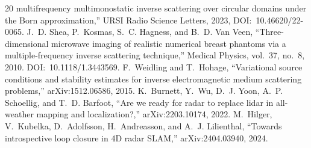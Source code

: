 \documentclass[12pt]{article}
\begin{document}
\begin{thebibliography}{20}
multifrequency multimonostatic inverse scattering over circular domains under
the Born approximation,'' URSI Radio Science Letters, 2023,
DOI:~10.46620/22-0065.
 J.~D. Shea, P.~Kosmas, S.~C. Hagness, and B.~D. Van Veen,
``Three-dimensional microwave imaging of realistic numerical breast phantoms
via a multiple-frequency inverse scattering technique,'' Medical Physics,
vol.~37, no.~8, 2010. DOI:~10.1118/1.3443569.
 F.~Weidling and T.~Hohage, ``Variational source conditions
and stability estimates for inverse electromagnetic medium scattering
problems,'' arXiv:1512.06586, 2015.
 K.~Burnett, Y.~Wu, D.~J. Yoon, A.~P. Schoellig, and
T.~D. Barfoot, ``Are we ready for radar to replace lidar in all-weather
mapping and localization?,'' arXiv:2203.10174, 2022.
 M.~Hilger, V.~Kubelka, D.~Adolfsson, H.~Andreasson, and
A.~J. Lilienthal, ``Towards introspective loop closure in 4D radar SLAM,''
arXiv:2404.03940, 2024.
\end{thebibliography}
\end{document}

